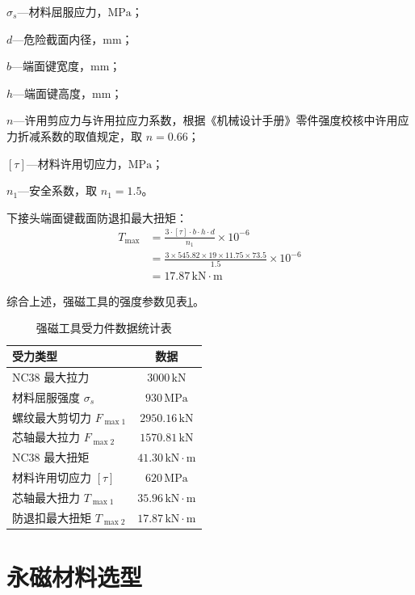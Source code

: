 $\sigma_s$---材料屈服应力，$\text{MPa}$；

$d$---危险截面内径，mm；

$b$---端面键宽度，mm；

$h$---端面键高度，mm；

$n$---许用剪应力与许用拉应力系数，根据《机械设计手册》零件强度校核中许用应力折减系数的取值规定\cite{ref26}，取 $n = 0.66$；

$[\tau]$---材料许用切应力，$\text{MPa}$；

$n_1$---安全系数，取 $n_1 = 1.5$。

下接头端面键截面防退扣最大扭矩：
\begin{align}
    T_{\max} &= \frac{3 \cdot [\tau] \cdot b \cdot h \cdot d}{n_1} \times 10^{-6} \\
             &= \frac{3 \times 545.82 \times 19 \times 11.75 \times 73.5}{1.5} \times 10^{-6} \\
             &= 17.87\,\text{kN}\cdot\text{m}
\end{align}


综合上述，强磁工具的强度参数见表\ref{tab:mag_tool_force_data}。

\begin{table}[htbp]
    \centering
    \caption{强磁工具受力件数据统计表}
    \label{tab:mag_tool_force_data}
    \renewcommand{\arraystretch}{1.5} %
    \begin{tabularx}{.9\textwidth}{Xc}
        \toprule
        受力类型 & 数据 \\
        \midrule
        NC38 最大拉力 & $3000\,\text{kN}$ \\
        材料屈服强度 $\sigma_s$ & $930\,\text{MPa}$ \\
        螺纹最大剪切力 $F_{\max1}$ & $2950.16\,\text{kN}$ \\
        芯轴最大拉力 $F_{\max2}$ & $1570.81\,\text{kN}$ \\
        NC38 最大扭矩 & $41.30\,\text{kN}\cdot\text{m}$ \\
        材料许用切应力 $[\tau]$ & $620\,\text{MPa}$ \\
        芯轴最大扭力 $T_{\max1}$ & $35.96\,\text{kN}\cdot\text{m}$ \\
        防退扣最大扭矩 $T_{\max2}$ & $17.87\,\text{kN}\cdot\text{m}$ \\
        \bottomrule
    \end{tabularx}
\end{table}


\section{永磁材料选型}


